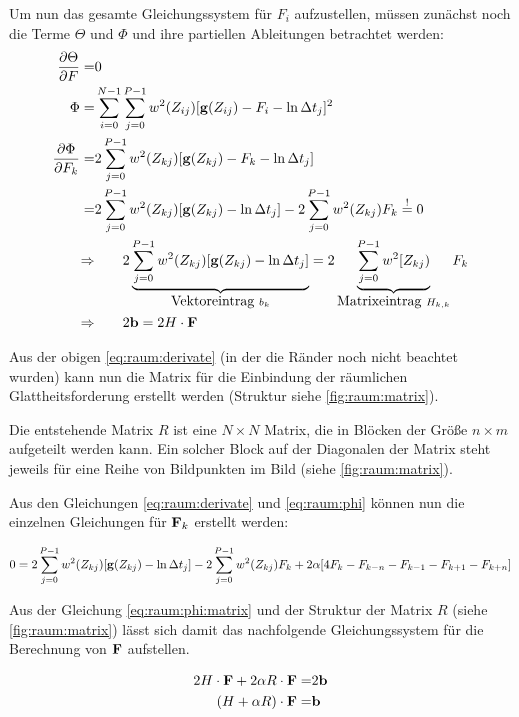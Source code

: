 Um nun das gesamte Gleichungssystem für $F_i$ aufzustellen, müssen zunächst noch die Terme $\Theta$ und $\Phi$ und ihre partiellen Ableitungen betrachtet werden:
\begin{align}
\frac{\partial \Theta}{\partial F} =& 0\\
\Phi =&\sum_{i=0}^{N-1} \sum_{j=0}^{P-1} w^2(Z_{ij})[\mathbf g(Z_{ij}) - F_i - \ln \Delta t_j]^2\\
\frac{\partial \Phi}{\partial F_k} =& 2 \sum_{j=0}^{P-1} w^2(Z_{kj})[\mathbf g(Z_{kj}) -F_k-\ln \Delta t_j]\\
\label{eq:raum:phi}
=& 2 \sum_{j=0}^{P-1} w^2(Z_{kj})[\mathbf g(Z_{kj}) -\ln \Delta t_j] - 2 \sum_{j=0}^{P-1} w^2(Z_{kj})F_k \overset{!}{=}0\\
\Rightarrow & \qquad 2 \underbrace{\sum_{j=0}^{P-1} w^2(Z_{kj})[\mathbf g(Z_{kj}) -\ln \Delta t_j]}_{\mbox{Vektoreintrag }b_k} = 2 \underbrace{\sum_{j=0}^{P-1} w^2[Z_{kj})}_{\mbox{Matrixeintrag } H_{k,k}}F_k\\
\label{eq:raum:phi:matrix}
\Rightarrow & \qquad 2 \mathbf b = 2 H \cdot \mathbf F
\end{align}


Aus der obigen \autoref{eq:raum:derivate} (in der die Ränder noch nicht beachtet wurden) kann nun die Matrix für die Einbindung der räumlichen Glattheitsforderung erstellt werden (Struktur siehe \autoref{fig:raum:matrix}).

Die entstehende Matrix $R$ ist eine $N \times N$ Matrix, die in Blöcken der Größe $n \times m$ aufgeteilt werden kann. Ein solcher Block auf der Diagonalen der Matrix  steht jeweils für eine Reihe von Bildpunkten im Bild (siehe \autoref{fig:raum:matrix}). 

Aus den Gleichungen \ref{eq:raum:derivate} und \ref{eq:raum:phi} können nun die einzelnen Gleichungen für $\mathbf F_k$ erstellt werden:

\begin{align}
 0 = 2 \sum_{j=0}^{P-1} w^2(Z_{kj})[\mathbf g(Z_{kj}) -\ln \Delta t_j] - 2 \sum_{j=0}^{P-1} w^2(Z_{kj})F_k + 2\alpha [4 F_k-F_{k-n} - F_{k-1} - F_{k+1} - F_{k+n}]
\end{align}

Aus der Gleichung \ref{eq:raum:phi:matrix} und der Struktur der Matrix $R$ (siehe \autoref{fig:raum:matrix}) lässt sich damit das nachfolgende Gleichungssystem für die Berechnung von $\mathbf F$ aufstellen. 

\begin{align}
2 H \cdot \mathbf F + 2 \alpha R\cdot \mathbf F =& 2 \mathbf b \\
\label{eq:raum:res}
(H+\alpha R)\cdot \mathbf F =& \mathbf b
\end{align}


